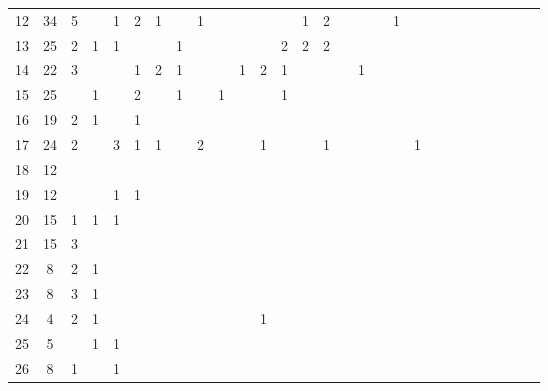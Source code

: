 \documentclass{article}
\begin{document}
\begin{table}[h]
{\begin{tabular}{|c|c|
c|c|c|c|c|c|c|c|c|c|c|c|c|c|c|c|c|c|c|c|c|c|c|c|c|c|}
12  & 34 & 5 &  & 1 & 2 & 1 &  & 1 &  &  &  &  & 1 & 2 &  &  &  & 1 &  &  &  &  &  &  &  &  & \\

13  & 25 & 2 & 1 & 1 &  &  & 1 &  &  &  &  & 2 & 2 & 2 &  &  &  &  &  &  &  &  &  &  &  &  & \\

14  & 22 & 3 &  &  & 1 & 2 & 1 &  &  & 1 & 2 & 1 &  &  &  & 1 &  &  &  &  &  &  &  &  &  &  & \\

15  & 25 &  & 1 &  & 2 &  & 1 &  & 1 &  &  & 1 &  &  &  &  &  &  &  &  &  &  &  &  &  &  & \\

16  & 19 & 2 & 1 &  & 1 &  &  &  &  &  &  &  &  &  &  &  &  &  &  &  &  &  &  &  &  &  & \\

17  & 24 & 2 &  & 3 & 1 & 1 &  & 2 &  &  & 1 &  &  & 1 &  &  &  &  & 1 &  &  &  &  &  &  &  & \\

18  & 12 &  &  &  &  &  &  &  &  &  &  &  &  &  &  &  &  &  &  &  &  &  &  &  &  &  & \\

19  & 12 &  &  & 1 & 1 &  &  &  &  &  &  &  &  &  &  &  &  &  &  &  &  &  &  &  &  &  & \\

20  & 15 & 1 & 1 & 1 &  &  &  &  &  &  &  &  &  &  &  &  &  &  &  &  &  &  &  &  &  &  & \\

21  & 15 & 3 &  &  &  &  &  &  &  &  &  &  &  &  &  &  &  &  &  &  &  &  &  &  &  &  & \\

22  & 8 & 2 & 1 &  &  &  &  &  &  &  &  &  &  &  &  &  &  &  &  &  &  &  &  &  &  &  & \\

23  & 8 & 3 & 1 &  &  &  &  &  &  &  &  &  &  &  &  &  &  &  &  &  &  &  &  &  &  &  & \\

24  & 4 & 2 & 1 &  &  &  &  &  &  &  & 1 &  &  &  &  &  &  &  &  &  &  &  &  &  &  &  & \\

25  & 5 &  & 1 & 1 &  &  &  &  &  &  &  &  &  &  &  &  &  &  &  &  &  &  &  &  &  &  & \\

26  & 8 & 1 &  & 1 &  &  &  &  &  &  &  &  &  &  &  &  &  &  &  &  &  &  &  &  &  &  & \\


\end{tabular}}
\end{table}
\end{document}
